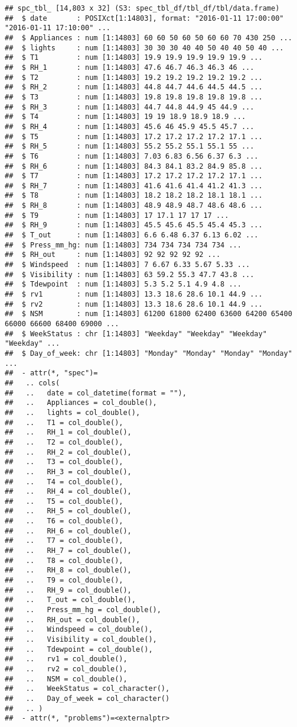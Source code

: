 \documentclass[
]{article}
\begin{document}
\begin{verbatim}
## spc_tbl_ [14,803 x 32] (S3: spec_tbl_df/tbl_df/tbl/data.frame)
##  $ date       : POSIXct[1:14803], format: "2016-01-11 17:00:00" "2016-01-11 17:10:00" ...
##  $ Appliances : num [1:14803] 60 60 50 60 50 60 60 70 430 250 ...
##  $ lights     : num [1:14803] 30 30 30 40 40 50 40 40 50 40 ...
##  $ T1         : num [1:14803] 19.9 19.9 19.9 19.9 19.9 ...
##  $ RH_1       : num [1:14803] 47.6 46.7 46.3 46.3 46 ...
##  $ T2         : num [1:14803] 19.2 19.2 19.2 19.2 19.2 ...
##  $ RH_2       : num [1:14803] 44.8 44.7 44.6 44.5 44.5 ...
##  $ T3         : num [1:14803] 19.8 19.8 19.8 19.8 19.8 ...
##  $ RH_3       : num [1:14803] 44.7 44.8 44.9 45 44.9 ...
##  $ T4         : num [1:14803] 19 19 18.9 18.9 18.9 ...
##  $ RH_4       : num [1:14803] 45.6 46 45.9 45.5 45.7 ...
##  $ T5         : num [1:14803] 17.2 17.2 17.2 17.2 17.1 ...
##  $ RH_5       : num [1:14803] 55.2 55.2 55.1 55.1 55 ...
##  $ T6         : num [1:14803] 7.03 6.83 6.56 6.37 6.3 ...
##  $ RH_6       : num [1:14803] 84.3 84.1 83.2 84.9 85.8 ...
##  $ T7         : num [1:14803] 17.2 17.2 17.2 17.2 17.1 ...
##  $ RH_7       : num [1:14803] 41.6 41.6 41.4 41.2 41.3 ...
##  $ T8         : num [1:14803] 18.2 18.2 18.2 18.1 18.1 ...
##  $ RH_8       : num [1:14803] 48.9 48.9 48.7 48.6 48.6 ...
##  $ T9         : num [1:14803] 17 17.1 17 17 17 ...
##  $ RH_9       : num [1:14803] 45.5 45.6 45.5 45.4 45.3 ...
##  $ T_out      : num [1:14803] 6.6 6.48 6.37 6.13 6.02 ...
##  $ Press_mm_hg: num [1:14803] 734 734 734 734 734 ...
##  $ RH_out     : num [1:14803] 92 92 92 92 92 ...
##  $ Windspeed  : num [1:14803] 7 6.67 6.33 5.67 5.33 ...
##  $ Visibility : num [1:14803] 63 59.2 55.3 47.7 43.8 ...
##  $ Tdewpoint  : num [1:14803] 5.3 5.2 5.1 4.9 4.8 ...
##  $ rv1        : num [1:14803] 13.3 18.6 28.6 10.1 44.9 ...
##  $ rv2        : num [1:14803] 13.3 18.6 28.6 10.1 44.9 ...
##  $ NSM        : num [1:14803] 61200 61800 62400 63600 64200 65400 66000 66600 68400 69000 ...
##  $ WeekStatus : chr [1:14803] "Weekday" "Weekday" "Weekday" "Weekday" ...
##  $ Day_of_week: chr [1:14803] "Monday" "Monday" "Monday" "Monday" ...
##  - attr(*, "spec")=
##   .. cols(
##   ..   date = col_datetime(format = ""),
##   ..   Appliances = col_double(),
##   ..   lights = col_double(),
##   ..   T1 = col_double(),
##   ..   RH_1 = col_double(),
##   ..   T2 = col_double(),
##   ..   RH_2 = col_double(),
##   ..   T3 = col_double(),
##   ..   RH_3 = col_double(),
##   ..   T4 = col_double(),
##   ..   RH_4 = col_double(),
##   ..   T5 = col_double(),
##   ..   RH_5 = col_double(),
##   ..   T6 = col_double(),
##   ..   RH_6 = col_double(),
##   ..   T7 = col_double(),
##   ..   RH_7 = col_double(),
##   ..   T8 = col_double(),
##   ..   RH_8 = col_double(),
##   ..   T9 = col_double(),
##   ..   RH_9 = col_double(),
##   ..   T_out = col_double(),
##   ..   Press_mm_hg = col_double(),
##   ..   RH_out = col_double(),
##   ..   Windspeed = col_double(),
##   ..   Visibility = col_double(),
##   ..   Tdewpoint = col_double(),
##   ..   rv1 = col_double(),
##   ..   rv2 = col_double(),
##   ..   NSM = col_double(),
##   ..   WeekStatus = col_character(),
##   ..   Day_of_week = col_character()
##   .. )
##  - attr(*, "problems")=<externalptr>
\end{verbatim}
\end{document}
